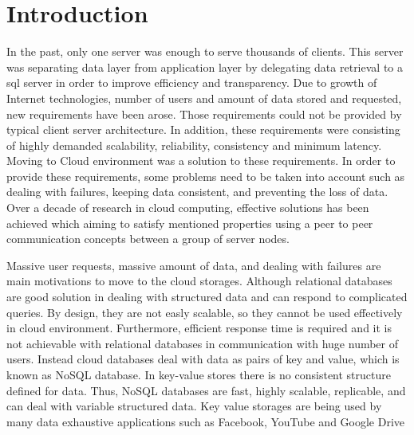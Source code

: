 \documentclass{sig-alternate}
\begin{document}
%


\section{Introduction}

In the past, only one server was enough to serve thousands of clients. This server was separating data layer from application layer by delegating data retrieval to a sql server in order to improve efficiency and transparency. Due to growth of Internet technologies, number of users and amount of data stored and requested, new requirements have been arose. Those requirements could not be provided by typical client server architecture. In addition, these requirements were consisting of highly demanded scalability, reliability, consistency and minimum latency. Moving to Cloud environment was a solution to these requirements. In order to provide these requirements, some problems need to be taken into account such as dealing with failures, keeping data consistent, and preventing the loss of data.%
Over a decade of research in cloud computing, effective solutions has been achieved which aiming to satisfy mentioned properties using a peer to peer communication concepts between a group of server nodes. 


Massive user requests, massive amount of data, and dealing with failures are main motivations to move to the cloud storages. Although relational databases are good solution in dealing with structured data and can respond to complicated queries. By design, they are not easly scalable, so they cannot be used effectively in cloud environment. Furthermore, efficient response time is required and it is not achievable with relational databases in communication with huge number of users. Instead cloud databases deal with data as pairs of key and value, which is known as NoSQL database. In key-value stores there is no consistent structure defined for data. Thus, NoSQL databases are fast, highly scalable, replicable, and can deal with variable structured data. Key value storages are being used by many data exhaustive applications such as Facebook, YouTube and Google Drive
\end{document}
